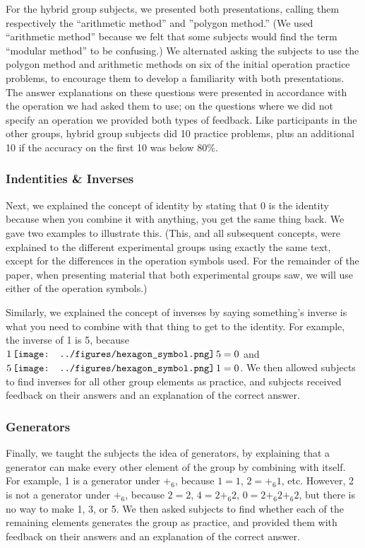 \documentclass[man,10pt]{apa6}
\newcommand{\hex}{\,\vcenter{\hbox{\texttt{[image: ../figures/hexagon\_symbol.png]}}}\,}
\begin{document}
For the hybrid group subjects, we presented both presentations, calling them respectively the ``arithmetic method'' and ''polygon method.'' (We used ``arithmetic method'' because we felt that some subjects would find the term ``modular method'' to be confusing.) We alternated asking the subjects to use the polygon method and arithmetic methods on six of the initial operation practice problems, to encourage them to develop a familiarity with both presentations. The answer explanations on these questions were presented in accordance with the operation we had asked them to use; on the questions where we did not specify an operation we provided both types of feedback. Like participants in the other groups, hybrid group subjects did 10 practice problems, plus an additional 10 if the accuracy on the first 10 was below 80\%. 
\subsubsection{Indentities \& Inverses}
Next, we explained the concept of identity by stating that 0 is the identity because when you combine it with anything, you get the same thing back. We gave two examples to illustrate this. (This, and all subsequent concepts, were explained to the different experimental groups using exactly the same text, except for the differences in the operation symbols used. For the remainder of the paper, when presenting material that both experimental groups saw, we will use either of the operation symbols.)\par
Similarly, we explained the concept of inverses by saying something's inverse is what you need to combine with that thing to get to the identity. For example, the inverse of 1 is 5, because $1 \hex 5 = 0$ and $5 \hex 1 = 0$. We then allowed subjects to find inverses for all other group elements as practice, and subjects received feedback on their answers and an explanation of the correct answer.
\subsubsection{Generators}
Finally, we taught the subjects the idea of generators, by explaining that a generator can make every other element of the group by combining with itself. For example, 1 is a generator under $+_6$, because $1 = 1$, $2 = +_6 1$, etc. However, 2 is not a generator under $+_6$, because $2 = 2$, $4 = 2 +_6 2$, $0 = 2 +_6 2 +_6 2$, but there is no way to make 1, 3, or 5. We then asked subjects to find whether each of the remaining elements generates the group as practice, and provided them with feedback on their answers and an explanation of the correct answer.
\end{document}
